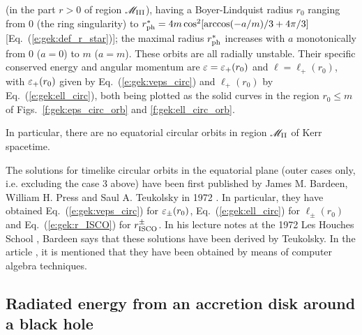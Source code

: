\begin{prop}
\begin{enumerate}
(in the part $r>0$ of region $\mathscr{M}_{\rm III}$),
having a Boyer-Lindquist radius $r_0$ ranging
from $0$ (the ring singularity) to
$r_{\rm ph}^* = 4 m \cos^2[\arccos(-a/m)/3 + 4\pi/3]$
[Eq.~(\ref{e:gek:def_r_star})];
the maximal radius $r_{\rm ph}^*$ increases with $a$ monotonically from $0$ ($a=0$) to $m$ ($a=m$).
These orbits are all radially unstable. Their specific conserved energy and angular momentum
are $\varepsilon = \varepsilon_+(r_0)$ and $\ell = \ell_+(r_0)$, with
$\varepsilon_+(r_0)$ given by Eq.~(\ref{e:gek:veps_circ}) and $\ell_+(r_0)$ by
Eq.~(\ref{e:gek:ell_circ}), both being plotted as the solid
curves in the region $r_0 \leq m$ of Figs.~\ref{f:gek:eps_circ_orb} and \ref{f:gek:ell_circ_orb}.
\end{enumerate}
In particular, there are no equatorial circular orbits in region $\mathscr{M}_{\rm II}$ of Kerr spacetime.
\end{prop}

\begin{hist}
The solutions for timelike circular orbits in the equatorial plane
(outer cases only, i.e. excluding the case 3 above) have been first published
by James M. Bardeen, William H. Press and Saul A. Teukolsky in 1972 \cite{BardePT72}.
In particular, they have obtained Eq.~(\ref{e:gek:veps_circ}) for $\varepsilon_\pm(r_0)$,
Eq.~(\ref{e:gek:ell_circ}) for $\ell_\pm(r_0)$ and Eq.~(\ref{e:gek:r_ISCO})
for $r_{\rm ISCO}^\pm$.
In his lecture notes at the 1972 Les Houches School \cite{Barde73a}, Bardeen says that these solutions have been derived by Teukolsky.
In the article \cite{BardePT72}, it is mentioned that they have been obtained by means of
computer algebra techniques.
\end{hist}


\subsection{Radiated energy from an accretion disk around a black hole}
\label{s:gek:radiated_energy}


